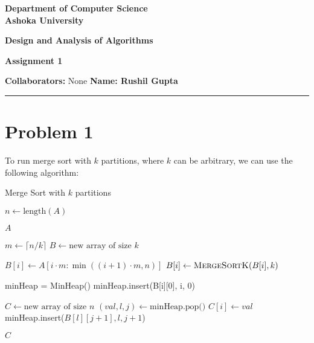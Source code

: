 \documentclass[a4paper]{article}
\begin{document}
\begin{center}
{\large \bf \color{red}  Department of Computer Science} \\
{\large \bf \color{red}  Ashoka University} \\

\vspace{0.1in}

{\large \bf \color{blue} Design and Analysis of Algorithms}

\vspace{0.05in}

    { \bf \color{YellowOrange} Assignment 1}
\end{center}
\medskip

{\textbf{Collaborators:} None} \hfill {\textbf{Name: Rushil Gupta} }

\bigskip
\hrule


\section*{Problem 1}
To run merge sort with $k$ partitions, where $k$ can be arbitrary, we can use the following algorithm:

\begin{algorithm}
\caption{Merge Sort with $k$ partitions}
\begin{algorithmic}[1]
    \State $n \gets \text{length}(A)$
    
    \vspace{0.5em}
     
        \State \Return $A$
    \EndIf

    \vspace{0.5em}
    \State $m \gets \lceil n/k \rceil$
    \State $B \gets \text{new array of size } k$
    
    \vspace{0.5em}
        \State $B[i] \gets A[i \cdot m : \min((i+1) \cdot m, n)]$
        \State $B[i] \gets \Call{MergeSortK}{B[i], k}$
    \EndFor
    \vspace{0.5em}

    \State minHeap = MinHeap() 
            \State minHeap.insert(B[i][0], i, 0) 
        \EndIf
    \EndFor

    \vspace{0.5em}
    \State $C \gets \text{new array of size } n$
        \State $(val, l, j) \gets \text{minHeap.pop()}$
        \State $C[i] \gets val$
            \State minHeap.insert($B[l][j+1], l, j+1$)
        \EndIf
    \EndFor
    \vspace{0.5em}
    
    \State \Return $C$
\EndFunction
\end{algorithmic}
\end{algorithm}
\end{document}
